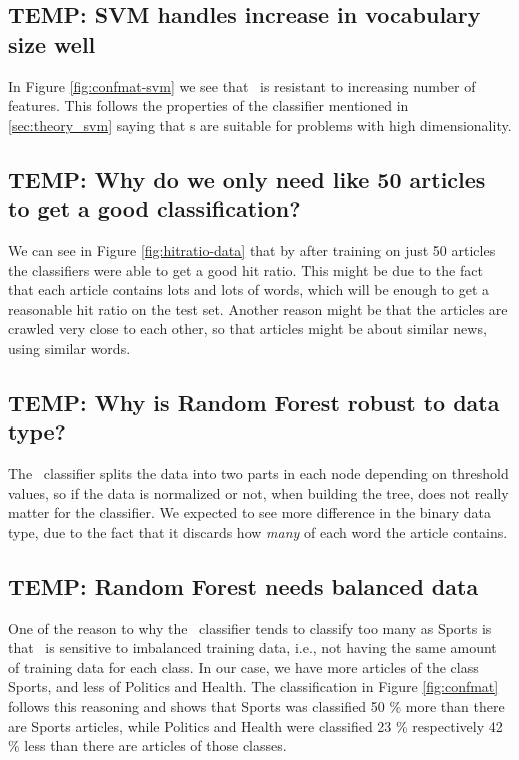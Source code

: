 \subsection{TEMP: SVM handles increase in vocabulary size well} %
In Figure \ref{fig:confmat-svm} we see that \svm\ is resistant to increasing number of features. This follows the properties of the classifier mentioned in \ref{sec:theory_svm} saying that \svm s are suitable for problems with high dimensionality.

\subsection{TEMP: Why do we only need like 50 articles to get a good classification?} %
\label{sub:temp_why_do_we_only_need_like_50_articles_to_get_a_good_classification_}
We can see in Figure \ref{fig:hitratio-data} that by after training on just 50 articles the classifiers were able to get a good hit ratio. This might be due to the fact that each article contains lots and lots of words, which will be enough to get a reasonable hit ratio on the test set. Another reason might be that the articles are crawled very close to each other, so that articles might be about similar news, using similar words.

\subsection{TEMP: Why is Random Forest robust to data type?} %
\label{sub:temp_why_is_random_forest_robust_to_data_type_}
The \rf\ classifier splits the data into two parts in each node depending on threshold values, so if the data is normalized or not, when building the tree, does not really matter for the classifier. We expected to see more difference in the binary data type, due to the fact that it discards how \emph{many} of each word the article contains.

\subsection{TEMP: Random Forest needs balanced data} %
\label{sub:temp_random_forest_needs_balanced_data}
One of the reason to why the \rf\ classifier tends to classify too many as Sports is that \rf\ is sensitive to imbalanced training data, i.e., not having the same amount of training data for each class. In our case, we have more articles of the class Sports, and less of Politics and Health. The classification in Figure \ref{fig:confmat} follows this reasoning and shows that Sports was classified 50 \% more than there are Sports articles, while Politics and Health were classified 23 \% respectively 42 \% less than there are articles of those classes.

